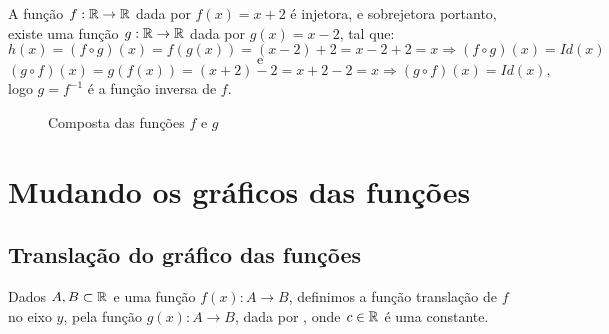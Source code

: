 \begin{exem}
 A função $f: \mathbb{R} \rightarrow \mathbb{R}$ dada por $f(x)= x+2$ é injetora, e sobrejetora portanto, existe uma função $g: \mathbb{R} \rightarrow \mathbb{R}$ dada por $g(x)= x-2$, tal que:
 \[h(x)= (f \circ g)(x)= f(g(x))= (x-2) + 2= x-2+2= x \Rightarrow (f \circ g)(x)= Id(x)\]
 \[\text{e}\]
 \[(g \circ f)(x)= g(f(x))= (x+2) - 2= x+2-2= x \Rightarrow (g \circ f)(x)= Id(x) ,\]
 logo $g= f^{-1}$ é a função inversa de $f$.

 \begin{figure}[H]
 \centering
    \caption{Composta das funções $f$ e $g$}
  \end{figure}

\end{exem}

\newpage
 \section{Mudando os gráficos das funções}

 \subsection{Translação do gráfico das funções}

 Dados $A, B \subset \mathbb{R}$ e uma função $f(x): A \to B$, definimos a função translação de $f$ no eixo $y$, pela função $g(x): A \to B$, dada por , onde $c \in \mathbb{R}$ é uma constante.

